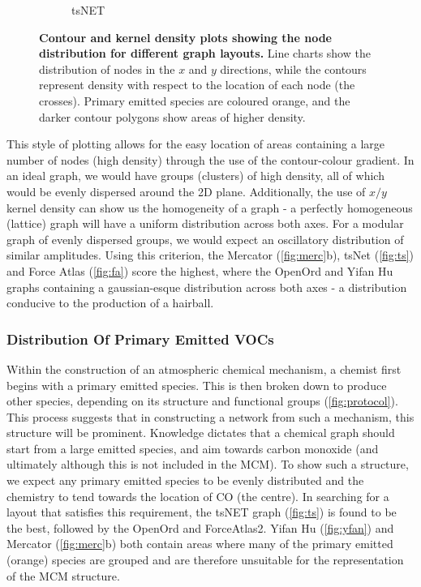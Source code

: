 \begin{figure}[H]
\begin{subfigure}[b]{.49\textwidth}
         \caption{tsNET}
         \label{fig:ts}
     \end{subfigure}
      \hfill
        \caption{ \textbf{Contour and kernel density plots showing the node distribution for different graph layouts.} Line charts show the distribution of nodes in the $x$ and $y$ directions, while the contours represent density with respect to the location of each node (the crosses). Primary emitted species are coloured orange, and the darker contour polygons show areas of higher density.}
        \label{fig:densitycompare}
\end{figure}

This style of plotting allows for the easy location of areas containing a large number of nodes (high density) through the use of the contour-colour gradient. In an ideal graph, we would have groups (clusters) of high density, all of which would be evenly dispersed around the 2D plane.
Additionally, the use of $x/y$ kernel density can show us the homogeneity of a graph - a perfectly homogeneous (lattice) graph will have a uniform distribution across both axes. For a modular graph of evenly dispersed groups, we would expect an oscillatory distribution of similar amplitudes. Using this criterion, the Mercator (\autoref{fig:merc}b), tsNet (\autoref{fig:ts}) and Force Atlas (\autoref{fig:fa}) score the highest, where the OpenOrd and Yifan Hu graphs containing a gaussian-esque distribution across both axes - a distribution conducive to the production of a hairball.

\subsubsection{Distribution Of Primary Emitted VOCs}

Within the construction of an atmospheric chemical mechanism, a chemist first begins with a primary emitted species. This is then broken down to produce other species, depending on its structure and functional groups (\autoref{fig:protocol}). This process suggests that in constructing a network from such a mechanism, this structure will be prominent. Knowledge dictates that a chemical graph should start from a large emitted species, and aim towards carbon monoxide (and ultimately  although this is not included in the MCM). To show such a structure, we expect any primary emitted species to be evenly distributed and the chemistry to tend towards the location of CO (the centre). In searching for a layout that satisfies this requirement, the tsNET graph (\autoref{fig:ts}) is found to be the best, followed by the OpenOrd and ForceAtlas2. Yifan Hu (\autoref{fig:yfan}) and Mercator (\autoref{fig:merc}b) both contain areas where many of the primary emitted (orange) species are grouped and are therefore unsuitable for the representation of the MCM structure.


